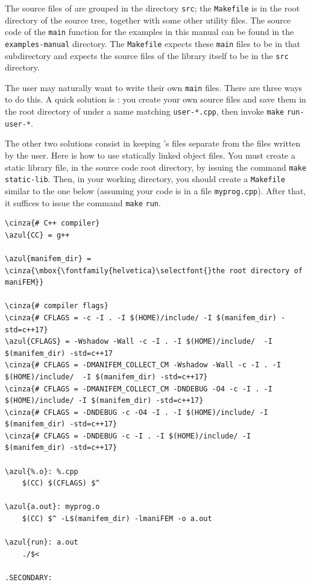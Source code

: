 The source files of {\maniFEM} are grouped in the directory {\small\tt src};
the {\small\tt Makefile} is in the root directory of the source tree,
together with some other utility files.
The source code of the {\small\tt main} function for the examples in this manual can be
found in the {\small\tt examples-manual} directory.
The {\small\tt Makefile} expects these {\small\tt main} files to be in that subdirectory
and expects the source files of the library itself to be in the {\small\tt src} directory.

The user may naturally want to write their own {\small\tt main} files.
There are three ways to do this.
A quick solution is : you create your own source files and save them in the root directory
of {\maniFEM} under a name matching {\small\tt user-*.cpp},
then invoke {\small\tt make} {\small\tt run-user-*}.

The other two solutions consist in keeping \maniFEM's files separate from the files written
by the user.
Here is how to use statically linked object files.
You must create a static library file, in the {\maniFEM} source code root directory,
by issuing the command {\small\tt make} {\small\tt static-lib}.
Then, in your working directory, you should create a {\small\tt Makefile} similar to
the one below (assuming your code is in a file {\small\tt myprog.cpp}).
After that, it suffices to issue the command {\small\tt make} {\small\tt run}.

\begin{Verbatim}[commandchars=\\\{\},formatcom=\small\tt,frame=single,
   label=Makefile,rulecolor=\color{moldura},
   baselinestretch=0.94,framesep=2mm                                            ]
\cinza{# C++ compiler}
\azul{CC} = g++

\azul{manifem_dir} = \cinza{\mbox{\fontfamily{helvetica}\selectfont{}the root directory of maniFEM}}

\cinza{# compiler flags}
\cinza{# CFLAGS = -c -I . -I $(HOME)/include/ -I $(manifem_dir) -std=c++17}
\azul{CFLAGS} = -Wshadow -Wall -c -I . -I $(HOME)/include/  -I $(manifem_dir) -std=c++17
\cinza{# CFLAGS = -DMANIFEM_COLLECT_CM -Wshadow -Wall -c -I . -I $(HOME)/include/  -I $(manifem_dir) -std=c++17}
\cinza{# CFLAGS = -DMANIFEM_COLLECT_CM -DNDEBUG -O4 -c -I . -I $(HOME)/include/ -I $(manifem_dir) -std=c++17}
\cinza{# CFLAGS = -DNDEBUG -c -O4 -I . -I $(HOME)/include/ -I $(manifem_dir) -std=c++17}
\cinza{# CFLAGS = -DNDEBUG -c -I . -I $(HOME)/include/ -I $(manifem_dir) -std=c++17}

\azul{%.o}: %.cpp
	$(CC) $(CFLAGS) $^

\azul{a.out}: myprog.o
	$(CC) $^ -L$(manifem_dir) -lmaniFEM -o a.out

\azul{run}: a.out
	./$<

.SECONDARY:
\end{Verbatim}


